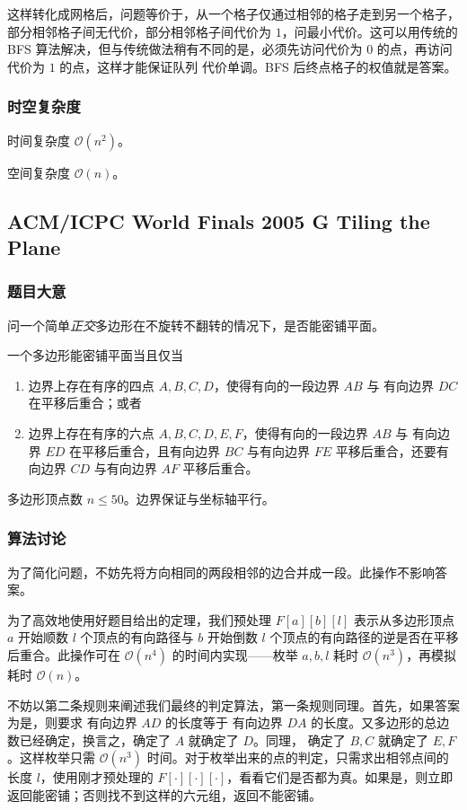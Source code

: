 				这样转化成网格后，问题等价于，从一个格子仅通过相邻的格子走到另一个格子，部分相邻格子间无代价，部分相邻格子间代价为 $1$，问最小代价。这可以用传统的 BFS 算法解决，但与传统做法稍有不同的是，必须先访问代价为 0 的点，再访问代价为 $1$ 的点，这样才能保证队列
				代价单调。BFS 后终点格子的权值就是答案。
			\subsubsection{时空复杂度}
				时间复杂度 $\mathcal{O}\left(n^2 \right)$。
					
				空间复杂度 $\mathcal{O}\left(n\right)$。

\newpage
		\subsection{ACM/ICPC World Finals 2005 G Tiling the Plane}
			\subsubsection{题目大意}
				问一个简单\emph{正交}多边形在不旋转不翻转的情况下，是否能密铺平面。
				
				一个多边形能密铺平面当且仅当
				\begin{enumerate}
					\item 边界上存在有序的四点 $A,B,C,D$，使得有向的一段边界 $AB$ 与 有向边界 $DC$ 在平移后重合；或者
					\item 边界上存在有序的六点 $A,B,C,D,E,F$，使得有向的一段边界 $AB$ 与 有向边界 $ED$ 在平移后重合，且有向边界 $BC$  与有向边界 $FE$  平移后重合，还要有向边界 $CD$  与有向边界 $AF$  平移后重合。
				\end{enumerate}
				多边形顶点数 $n \le 50$。边界保证与坐标轴平行。
			\subsubsection{算法讨论}
				为了简化问题，不妨先将方向相同的两段相邻的边合并成一段。此操作不影响答案。
				
				为了高效地使用好题目给出的定理，我们预处理 $F[a][b][l]$ 表示从多边形顶点 $a$ 开始顺数 $l$ 个顶点的有向路径与 $b$ 开始倒数 $l$ 个顶点的有向路径的逆是否在平移后重合。此操作可在 $\mathcal{O}\left(n^4 \right)$ 的时间内实现——枚举 $a, b, l$ 耗时 $\mathcal{O}\left(n^3 \right)$，再模拟 耗时  $\mathcal{O}\left(n \right)$。
				
				不妨以第二条规则来阐述我们最终的判定算法，第一条规则同理。首先，如果答案为是，则要求 有向边界 $AD$ 的长度等于 有向边界 $DA$ 的长度。又多边形的总边数已经确定，换言之，确定了 $A$ 就确定了 $D$。同理， 确定了 $B, C$ 就确定了 $E,F$。这样枚举只需 $\mathcal{O}\left(n^3 \right)$ 时间。对于枚举出来的点的判定，只需求出相邻点间的长度 $l$，使用刚才预处理的 $F[\cdot][\cdot][\cdot]$，看看它们是否都为真。如果是，则立即返回能密铺；否则找不到这样的六元组，返回不能密铺。
				
